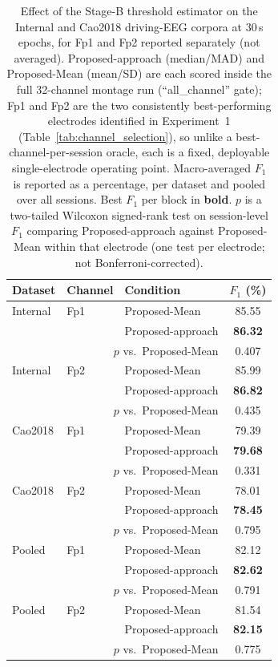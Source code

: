 \begin{table}[ht]
  \centering
  \caption{Effect of the Stage-B threshold estimator on the Internal and Cao2018 driving-EEG corpora at 30\,s epochs, for Fp1 and Fp2 reported separately (not averaged). Proposed-approach (median/MAD) and Proposed-Mean (mean/SD) are each scored inside the full 32-channel montage run (``all\_channel'' gate); Fp1 and Fp2 are the two consistently best-performing electrodes identified in Experiment~1 (Table~\ref{tab:channel_selection}), so unlike a best-channel-per-session oracle, each is a fixed, deployable single-electrode operating point. Macro-averaged $F_1$ is reported as a percentage, per dataset and pooled over all sessions. Best $F_1$ per block in \textbf{bold}. $p$ is a two-tailed Wilcoxon signed-rank test on session-level $F_1$ comparing Proposed-approach against Proposed-Mean within that electrode (one test per electrode; not Bonferroni-corrected).}
  \label{tab:exp3_estimator}
  \begin{tabular}{lllc}
    \toprule
    Dataset & Channel & Condition & $F_1$ (\%) \\
    \midrule
    Internal & Fp1 & Proposed-Mean & 85.55 \\
     &  & Proposed-approach & \textbf{86.32} \\
    \multicolumn{3}{r}{$p$ vs.\ Proposed-Mean} & 0.407 \\
    \midrule
    Internal & Fp2 & Proposed-Mean & 85.99 \\
     &  & Proposed-approach & \textbf{86.82} \\
    \multicolumn{3}{r}{$p$ vs.\ Proposed-Mean} & 0.435 \\
    \midrule
    Cao2018 & Fp1 & Proposed-Mean & 79.39 \\
     &  & Proposed-approach & \textbf{79.68} \\
    \multicolumn{3}{r}{$p$ vs.\ Proposed-Mean} & 0.331 \\
    \midrule
    Cao2018 & Fp2 & Proposed-Mean & 78.01 \\
     &  & Proposed-approach & \textbf{78.45} \\
    \multicolumn{3}{r}{$p$ vs.\ Proposed-Mean} & 0.795 \\
    \midrule
    Pooled & Fp1 & Proposed-Mean & 82.12 \\
     &  & Proposed-approach & \textbf{82.62} \\
    \multicolumn{3}{r}{$p$ vs.\ Proposed-Mean} & 0.791 \\
    \midrule
    Pooled & Fp2 & Proposed-Mean & 81.54 \\
     &  & Proposed-approach & \textbf{82.15} \\
    \multicolumn{3}{r}{$p$ vs.\ Proposed-Mean} & 0.775 \\
    \bottomrule
  \end{tabular}
\end{table}
